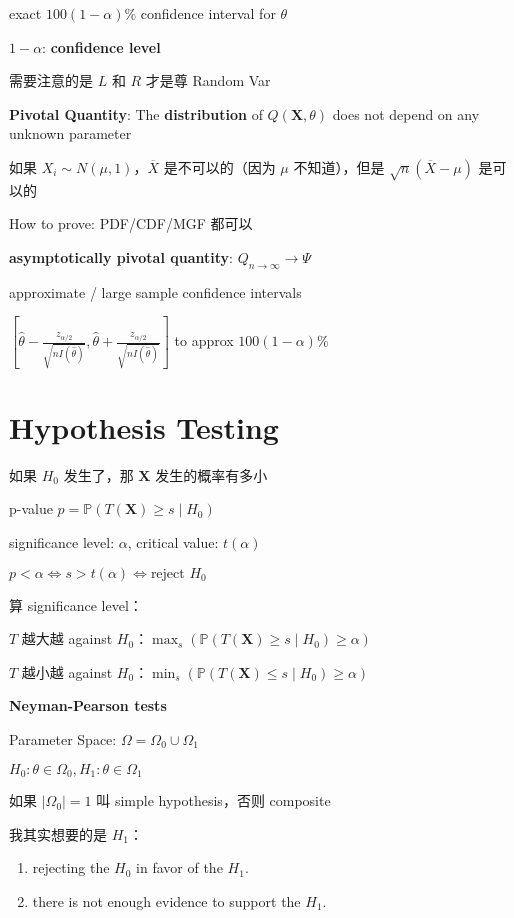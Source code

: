 \documentclass[9pt,landscape]{article}
\begin{document}
\begin{multicols}{3}
exact $100(1-\alpha)\%$ confidence interval for $\theta$

$1-\alpha$: \textbf{confidence level}

需要注意的是 $L$ 和 $R$ 才是尊 Random Var

\textbf{Pivotal Quantity}: The \textbf{distribution} of $Q(\boldsymbol{X}, \theta)$ does not depend on any unknown parameter

如果 $X_i\sim N(\mu, 1)$，$\overline{X}$ 是不可以的（因为 $\mu$ 不知道），但是 $\sqrt{n}(\overline{X}-\mu)$ 是可以的

How to prove: PDF/CDF/MGF 都可以

\textbf{asymptotically pivotal quantity}: $Q_{n\to\infty}\to\Psi$

approximate / large sample confidence intervals

$\left[\hat{\theta}-\frac{z_{\alpha/2}}{\sqrt{nI(\hat{\theta})}}, \hat{\theta}+\frac{z_{\alpha/2}}{\sqrt{nI(\hat{\theta})}}\right]$ to approx $100(1-\alpha)\%$

\section{Hypothesis Testing}

如果 $H_0$ 发生了，那 $\boldsymbol{X}$ 发生的概率有多小

p-value $p=\mathbb{P}(T(\boldsymbol{X})\ge s\mid H_0)$

significance level: $\alpha$, critical value: $t(\alpha)$

$p<\alpha\Leftrightarrow s>t(\alpha)\Leftrightarrow\text{reject } H_0$

算 significance level：

$T$ 越大越 against $H_0$：$\max_s(\mathbb{P}(T(\boldsymbol{X})\ge s\mid H_0)\ge\alpha)$

$T$ 越小越 against $H_0$：$\min_s(\mathbb{P}(T(\boldsymbol{X})\le s\mid H_0)\ge\alpha)$

\textbf{Neyman-Pearson tests}

Parameter Space: $\Omega=\Omega_0\cup\Omega_1$

$H_0: \theta\in\Omega_0, H_1: \theta\in\Omega_1$

如果 $|\Omega_0|=1$ 叫 simple hypothesis，否则 composite

我其实想要的是 $H_1$：
\begin{enumerate}
	\item rejecting the $H_0$ in favor of the $H_1$.
	\item there is not enough evidence to support the $H_1$.
\end{enumerate}


\end{multicols}
\end{document}
